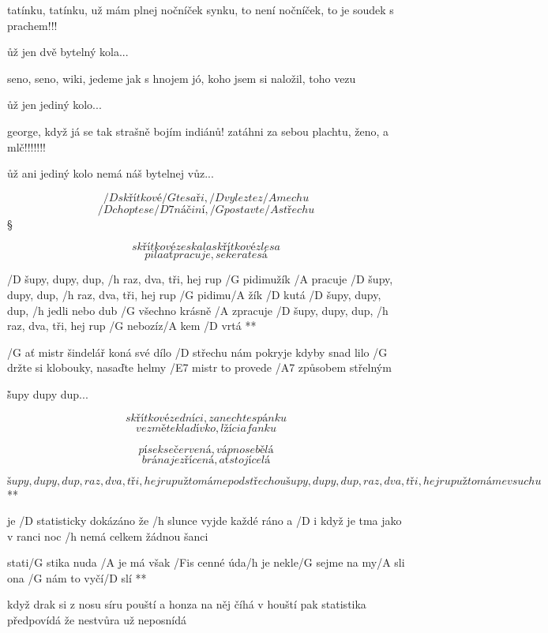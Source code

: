 tatínku, tatínku, už mám plnej nočníček
synku, to není nočníček, to je soudek s prachem!!!

\r už jen dvě bytelný kola...

seno, seno, wiki, jedeme jak s hnojem
jó, koho jsem si naložil, toho vezu

\r už jen jediný kolo...

george, když já se tak strašně bojím indiánů!
zatáhni za sebou plachtu, ženo, a mlč!!!!!!!

\r už ani jediný kolo nemá náš bytelnej vůz... \songgg




\[ /D skřítkové /G tesaři, /D vylezte z /A mechu \]
\[ /D chopte se /D7 náčiní, /G postavte /A střechu \] \S

\[ skřítkové ze skal a skřítkové z lesa \]
\[ pila ať pracuje, sekera tesá \]

\R  /D šupy, dupy, dup, /h raz, dva, tři, hej rup
    /G pidimužík /A pracuje
    /D šupy, dupy, dup, /h raz, dva, tři, hej rup
    /G pidimu/A žík /D kutá
    /D šupy, dupy, dup, /h jedli nebo dub
    /G všechno krásně /A zpracuje
    /D šupy, dupy, dup, /h raz, dva, tři, hej rup
    /G nebozíz/A kem /D vrtá **

/G ať mistr šindelář koná své dílo
/D střechu nám pokryje kdyby snad lilo
/G držte si klobouky, nasaďte helmy
/E7 mistr to provede /A7 způsobem střelným

\r šupy dupy dup...

\[ skřítkové zedníci, zanechte spánku \]
\[ vezměte kladívko, lžíci a fanku \] \s

\[ písek se červená, vápno se bělá \]
\[ brána je zřícená, ať stojí celá \]

\R  \[ šupy, dupy, dup, raz, dva, tři, hej rup
    už to máme pod střechou
    šupy, dupy, dup, raz, dva, tři, hej rup
    už to máme v suchu \] **



je /D statisticky dokázáno
že /h slunce vyjde každé ráno
a /D i když je tma jako v ranci
noc /h nemá celkem žádnou šanci

\R  stati/G stika nuda /A je
    má však /Fis cenné úda/h je
    nekle/G sejme na my/A sli
    ona /G nám to vyčí/D slí **

když drak si z nosu síru pouští
a honza na něj číhá v houští
pak statistika předpovídá
že nestvůra už neposnídá

